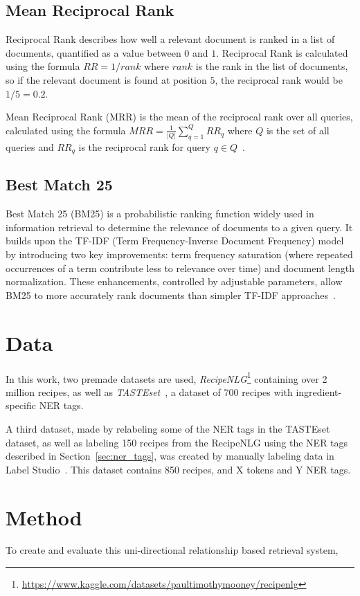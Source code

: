 \documentclass[11pt]{article}
\begin{document}
\subsection{Mean Reciprocal Rank}
Reciprocal Rank describes how well a relevant document is ranked in a list of
documents, quantified as a value between $0$ and $1$.
Reciprocal Rank is calculated using the formula $RR = 1/rank$ where $rank$ is the
rank in the list of documents, so if the relevant document is found at position
$5$, the reciprocal rank would be $1/5 = 0.2$.

Mean Reciprocal Rank (MRR) is the mean of the reciprocal rank over all queries,
calculated using the formula $MRR = \frac{1}{|Q|} \sum_{q=1}^Q{RR_q}$ where $Q$ is
the set of all queries and $RR_q$ is the reciprocal rank for query $q \in
Q$~\cite{mrr}.
\subsection{Best Match 25}
Best Match 25 (BM25) is a probabilistic ranking function widely used in
information retrieval to determine the relevance of documents to a given query.
It builds upon the TF-IDF (Term Frequency-Inverse Document Frequency) model by
introducing two key improvements: term frequency saturation (where repeated
occurrences of a term contribute less to relevance over time) and document
length normalization. These enhancements, controlled by adjustable parameters,
allow BM25 to more accurately rank documents than simpler TF-IDF
approaches~\cite{ogBM25, improvmenetsBM25}.

\section{Data}
In this work, two premade datasets are used,
\emph{RecipeNLG}\footnote{\url{https://www.kaggle.com/datasets/paultimothymooney/recipenlg}}
containing over 2 million recipes, as well as
\emph{TASTEset}~\cite{TASTEset}, a dataset of
700 recipes with ingredient-specific NER tags.

A third dataset, made by relabeling some of the NER tags in the TASTEset dataset,
as well as labeling 150 recipes from the RecipeNLG using the NER tags
described in Section~\ref{sec:ner_tags}, was created by manually labeling
data in Label Studio~\cite{LabelStudio}.
This dataset contains 850 recipes, and X tokens and Y NER tags.

\section{Method}
To create and evaluate this uni-directional relationship based retrieval system, 
\end{document}
